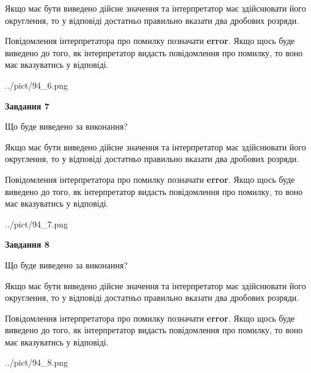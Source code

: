 \documentclass[12pt, ukrainian]{article}
\begin{document}
{\begin {Large}
Якщо має бути виведено дійсне значення та інтерпретатор має здійснювати його округлення, 
то у відповіді достатньо правильно вказати два дробових розряди.

Повідомлення інтерпретатора про помилку позначати \textbf{error}.
Якщо щось буде виведено до того, як інтерпретатор видасть повідомлення про помилку, 
то воно має вказуватись у відповіді. \par

\begin{center}
	{../pict/94_6.png}
\end{center}
\newpage

{\begin {center}\textbf{Завдання 7}\end {center}}\par
Що буде виведено за виконання? \par

Якщо має бути виведено дійсне значення та інтерпретатор має здійснювати його округлення, 
то у відповіді достатньо правильно вказати два дробових розряди.

Повідомлення інтерпретатора про помилку позначати \textbf{error}.
Якщо щось буде виведено до того, як інтерпретатор видасть повідомлення про помилку, 
то воно має вказуватись у відповіді. \par

\begin{center}
	{../pict/94_7.png}
\end{center}
\newpage

{\begin {center}\textbf{Завдання 8}\end {center}}\par
Що буде виведено за виконання? \par

Якщо має бути виведено дійсне значення та інтерпретатор має здійснювати його округлення, 
то у відповіді достатньо правильно вказати два дробових розряди.

Повідомлення інтерпретатора про помилку позначати \textbf{error}.
Якщо щось буде виведено до того, як інтерпретатор видасть повідомлення про помилку, 
то воно має вказуватись у відповіді. \par

\begin{center}
	{../pict/94_8.png}
\end{center}
\newpage


\end{Large}}
\end{document}
